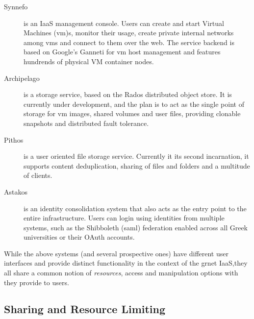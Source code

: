 \documentclass[preprint,10pt]{sigplanconf}
\begin{document}
\begin{description}

    \item[Synnefo] is an IaaS management console. Users can create and start
        Virtual Machines ({\sc vm})s, monitor their usage, create private
        internal networks among {\sc vm}s and connect to them over the web. The
        service backend is based on Google's Ganneti for {\sc vm} host
        management and features hundrends of physical VM container nodes.

    \item[Archipelago] is a storage service, based on the Rados distributed
        object store. It is currently under development, and the plan is to act
        as the single point of storage for {\sc vm} images, shared volumes and
        user files, providing clonable snapshots and distributed fault
        tolerance.
    
    \item[Pithos] is a user oriented file storage service. Currently it its
        second incarnation, it supports content deduplication, sharing of files
        and folders and a multitude of clients.

    \item[Astakos] is an identity consolidation system that also acts as the
        entry point to the entire infrastructure. Users can login using
        identities from multiple systems, such as the Shibboleth ({\sc saml})
        federation enabled across all Greek universities or their OAuth 
        accounts.

\end{description}

While the above systems (and several prospective ones) have different user
interfaces and provide distinct functionality in the context of the {\sc grnet}
IaaS,they all share a common notion of \emph{resources}, access and
manipulation options with they provide to users. 

\subsection{Sharing and Resource Limiting}
\end{document}
